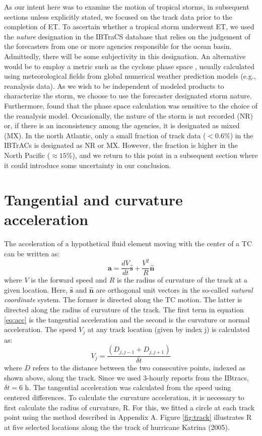\documentclass[wcd,manuscript]{copernicus}
\begin{document}
 As our intent here was to examine the motion of tropical storms, in subsequent sections unless explicitly stated,  we focused on the track data prior to the completion of ET. To ascertain whether a tropical storm underwent ET, we used the \emph{nature} designation in the IBTraCS database that relies on the judgement of the forecasters from one or more agencies responsible for the ocean basin.  Admittedly, there will be some subjectivity in this designation. An alternative would be to employ a metric such as the cyclone phase space \citep{Hart2003}, usually calculated using meteorological fields from global numerical weather prediction models (e.g., reanalysis data). As we wish to be independent of modeled products to characterize the storm, we choose to use the forecaster designated storm nature. Furthermore, \cite{BCSEH2019a} found that the phase space calculation was sensitive to the choice of the reanalysis model. Occasionally, the nature of the storm is not recorded (NR) or, if there is an inconsistency among the agencies, it is designated as mixed (MX). In the north Atlantic, only a small fraction of track data ($<0.6\%$) in the IBTrACs is designated as NR or MX. However, the fraction is higher in the North Pacific ($\approx 15\%$), and we return to this point in a subsequent section where it could introduce some uncertainty in our conclusion.
 
 
\section{Tangential and curvature acceleration}
The acceleration of a hypothetical fluid element moving with the center of a TC can be written as:
%
\begin{equation}
    \mathbf{a} = \frac{dV}{dt} \mathbf{\hat{s}} + \frac{V^2}{R} \mathbf{\hat{n}} 
    \label{eq:acc}
\end{equation}
%
where $V$ is the forward speed and $R$ is the radius of curvature of the track at a given location. Here, $\mathbf{\hat{s}}$ and $\mathbf{\hat{n}}$ are orthogonal unit vectors in the so-called \emph{natural coordinate} system. The former is directed along the TC motion. The latter is directed along the radius of curvature of the track.  The first term in equation \ref{eq:acc} is the tangential acceleration and the second is the curvature or normal acceleration. The speed $V_j$ at any track location (given by index j)  is calculated as:
%
\begin{equation}
V_j = \frac{(D_{j,j-1} +  D_{j,j+1})}{\delta t}
\end{equation}
%
where $D$ refers to the distance between the two consecutive points, indexed as shown above, along the track. Since we used 3-hourly reports from the IBtracs, $\delta t = 6$ h. The tangential acceleration was calculated from the speed using centered differences. To calculate the curvature acceleration, it is necessary to first calculate the radius of curvature, R. For this, we  fitted a circle at each track point using the method described in Appendix A. Figure \ref{fig:track} illustrates R at five selected locations along the the track of hurricane Katrina (2005). 
\end{document}
